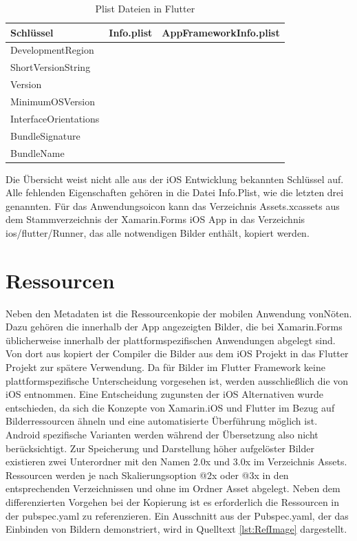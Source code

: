 \begin{table}[!ht]
  \begin{tabularx}{\linewidth}{X| X| X}
  \textbf{Schlüssel}  &  \textbf{Info.plist} & \textbf{AppFrameworkInfo.plist} \\
\hline
  DevelopmentRegion  		&  					& 		\checkmark	 \\
  ShortVersionString  		&  					& 		\checkmark	 \\
  Version  							&  					& 		\checkmark	 \\
  MinimumOSVersion  		&  					& 		\checkmark	 \\
  
  InterfaceOrientations  		& \checkmark  	&		 					\\
  BundleSignature  			&  \checkmark 	& 							\\
  BundleName  					&  \checkmark 	& 		 					\\
\end{tabularx}
\caption{Plist Dateien in Flutter }
 \label{tab:InfoPlist}
\end{table}
Die Übersicht weist nicht alle aus der iOS Entwicklung bekannten Schlüssel auf.  Alle fehlenden Eigenschaften gehören in die Datei Info.Plist,  wie die letzten drei genannten. 
Für das Anwendungsoicon kann das Verzeichnis Assets.xcassets aus dem Stammverzeichnis der Xamarin.Forms iOS App in das Verzeichnis ios/flutter/Runner, das alle notwendigen Bilder enthält,  kopiert werden. 

\section{Ressourcen}

Neben den Metadaten ist die Ressourcenkopie der mobilen Anwendung vonNöten. 
Dazu gehören die innerhalb der App angezeigten Bilder, die bei Xamarin.Forms
üblicherweise innerhalb der plattformspezifischen Anwendungen abgelegt sind.
Von dort aus kopiert der Compiler die Bilder aus dem iOS Projekt in das Flutter Projekt zur spätere Verwendung.  Da für Bilder im Flutter Framework keine plattformspezifische Unterscheidung vorgesehen ist,  werden ausschließlich die von iOS entnommen. Eine Entscheidung zugunsten der iOS Alternativen wurde  entschieden,  da sich die Konzepte von Xamarin.iOS und Flutter im Bezug auf Bilderressourcen ähneln und eine automatisierte Überführung möglich ist.  Android spezifische Varianten werden während der Übersetzung also nicht berücksichtigt.   
Zur Speicherung und Darstellung höher aufgelöster Bilder existieren zwei Unterordner mit den Namen 2.0x und 3.0x im Verzeichnis Assets.  Ressourcen werden je nach Skalierungsoption @2x oder @3x in den entsprechenden Verzeichnissen und ohne im Ordner Asset abgelegt.
Neben dem differenzierten Vorgehen bei der Kopierung ist es erforderlich die Ressourcen in der pubspec.yaml zu referenzieren.  Ein Ausschnitt aus der Pubspec.yaml,  der das Einbinden von Bildern demonstriert,  wird in Quelltext  \ref{lst:RefImage} dargestellt.

